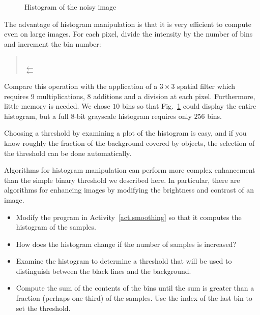 \begin{figure}
\begin{center}
\caption{Histogram of the noisy image}\label{fig.hist}
\end{center}
\end{figure}

The advantage of histogram manipulation is that it is very efficient to compute even on large images. For each pixel, divide the intensity by the number of bins and increment the bin number:
\begin{quote}
\\
\hspace*{2em} $\leftarrow$ \\
\hspace*{2em} $\leftarrow$ 
\end{quote}
Compare this operation with the application of a $3\times 3$ spatial filter which requires $9$ multiplications, $8$ additions and a division at each pixel. Furthermore, little memory is needed. We chose $10$ bins so that Fig.~\ref{fig.hist} could display the entire histogram, but a full $8$-bit grayscale histogram requires only $256$ bins.

Choosing a threshold by examining a plot of the histogram is easy, and if you know roughly the fraction of the background covered by objects, the selection of the threshold can be done automatically.

Algorithms for histogram manipulation can perform more complex enhancement than the simple binary threshold we described here. In particular, there are algorithms for enhancing images by modifying the brightness and contrast of an image. 

\begin{framed}
\begin{itemize}
\item Modify the program in Activity~\ref{act.smoothing} so that it computes the histogram of the samples.
\item How does the histogram change if the number of samples is increased?
\item Examine the histogram to determine a threshold that will be used to distinguish between the black lines and the background.
\item Compute the sum of the contents of the bins until the sum is greater than a fraction (perhaps one-third) of the samples. Use the index of the last bin to set the threshold.
\end{itemize}
\end{framed}

